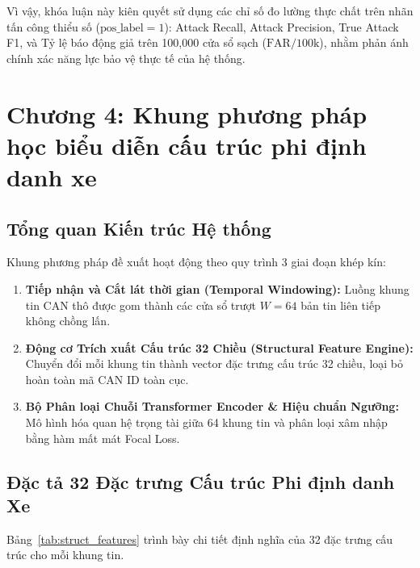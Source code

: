 \documentclass[12pt, a4paper, reqno, oneside]{book}
\begin{document}
Vì vậy, khóa luận này kiên quyết sử dụng các chỉ số đo lường thực chất trên nhãn tấn công thiểu số ($\text{pos\_label} = 1$): Attack Recall, Attack Precision, True Attack F1, và Tỷ lệ báo động giả trên 100,000 cửa sổ sạch ($\text{FAR} / 100\text{k}$), nhằm phản ánh chính xác năng lực bảo vệ thực tế của hệ thống.

\chapter{Chương 4: Khung phương pháp học biểu diễn cấu trúc phi định danh xe}
\label{chap:method}

\section{Tổng quan Kiến trúc Hệ thống}
\label{sec:method_overview}

Khung phương pháp đề xuất hoạt động theo quy trình 3 giai đoạn khép kín:
\begin{enumerate}
    \item \textbf{Tiếp nhận và Cắt lát thời gian (Temporal Windowing):} Luồng khung tin CAN thô được gom thành các cửa sổ trượt $W = 64$ bản tin liên tiếp không chồng lấn.
    \item \textbf{Động cơ Trích xuất Cấu trúc 32 Chiều (Structural Feature Engine):} Chuyển đổi mỗi khung tin thành vector đặc trưng cấu trúc 32 chiều, loại bỏ hoàn toàn mã CAN ID toàn cục.
    \item \textbf{Bộ Phân loại Chuỗi Transformer Encoder \& Hiệu chuẩn Ngưỡng:} Mô hình hóa quan hệ trọng tài giữa 64 khung tin và phân loại xâm nhập bằng hàm mất mát Focal Loss.
\end{enumerate}

\section{Đặc tả 32 Đặc trưng Cấu trúc Phi định danh Xe}
\label{sec:method_features}

Bảng~\ref{tab:struct_features} trình bày chi tiết định nghĩa của 32 đặc trưng cấu trúc cho mỗi khung tin.
\end{document}
